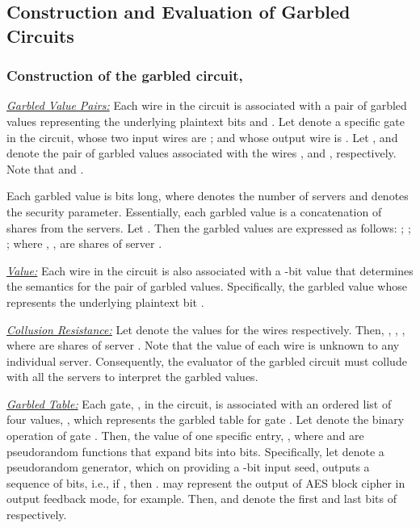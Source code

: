 \documentclass[10pt,journal,cspaper,compsoc]{IEEEtran}
\begin{document}
\subsection{Construction and Evaluation of Garbled Circuits}
\label{sec_garbled_circuit_BMR}


\subsubsection{Construction of the garbled circuit, }
\label{sec_garbled_circuit_BMR_construction}

\underline{\em Garbled Value Pairs:} Each wire in the circuit is associated with a pair of garbled values representing the underlying plaintext bits  and . Let  denote a specific gate in the circuit, whose two input wires are ; and whose output wire is . Let ,  and  denote the pair of garbled values associated with the wires ,  and , respectively. Note that  and .


Each garbled value is  bits long, where  denotes the number of servers and  denotes the security parameter. Essentially, each garbled value is a concatenation of shares from the  servers. Let . Then the garbled values are expressed as follows: ; ; ; where , ,  are shares of server .


\underline{\em  Value:} Each wire in the circuit is also associated with a -bit  value that determines the semantics for the pair of garbled values. Specifically, the garbled value whose  represents the underlying plaintext bit .


\underline{\em Collusion Resistance:} Let  denote the  values for the wires  respectively. Then, , , , where  are shares of server . Note that the  value of each wire is unknown to any individual server. Consequently, the evaluator of the garbled circuit must collude with all the  servers to interpret the garbled values.


\underline{\em Garbled Table:} Each gate, , in the circuit, is associated with an ordered list of four values, , which represents the garbled table for gate . Let  denote the binary operation of gate . Then, the value of one specific entry, , where  and  are pseudorandom functions that expand  bits into  bits. Specifically, let  denote a pseudorandom generator, which on providing a -bit input seed, outputs a sequence of  bits, i.e., if , then .  may represent the output of AES block cipher in output feedback mode, for example. Then,  and  denote the first and last  bits of  respectively.
\end{document}
